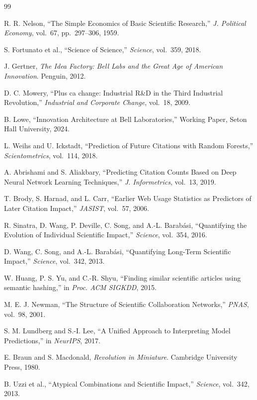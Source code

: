 \documentclass[journal]{IEEEtran}
\begin{document}
\begin{thebibliography}{99}

R. R. Nelson, ``The Simple Economics of Basic Scientific Research,''
\textit{J. Political Economy}, vol.~67, pp.~297--306, 1959.

S. Fortunato et al., ``Science of Science,'' \textit{Science}, vol.~359, 2018.

J. Gertner, \textit{The Idea Factory: Bell Labs and the Great Age of American Innovation}. Penguin, 2012.

D. C. Mowery, ``Plus ca change: Industrial R\&D in the Third Industrial Revolution,'' \textit{Industrial and Corporate Change}, vol.~18, 2009.

B. Lowe, ``Innovation Architecture at Bell Laboratories,'' Working Paper, Seton Hall University, 2024.

L. Weihs and U. Ickstadt, ``Prediction of Future Citations with Random Forests,'' \textit{Scientometrics}, vol.~114, 2018.

A. Abrishami and S. Aliakbary, ``Predicting Citation Counts Based on Deep Neural Network Learning Techniques,'' \textit{J. Informetrics}, vol.~13, 2019.

T. Brody, S. Harnad, and L. Carr, ``Earlier Web Usage Statistics as Predictors of Later Citation Impact,'' \textit{JASIST}, vol.~57, 2006.

R. Sinatra, D. Wang, P. Deville, C. Song, and A.-L. Barab\'asi, ``Quantifying the Evolution of Individual Scientific Impact,'' \textit{Science}, vol.~354, 2016.

D. Wang, C. Song, and A.-L. Barab\'asi, ``Quantifying Long-Term Scientific Impact,'' \textit{Science}, vol.~342, 2013.

W. Huang, P. S. Yu, and C.-R. Shyu, ``Finding similar scientific articles using semantic hashing,'' in \textit{Proc. ACM SIGKDD}, 2015.

M. E. J. Newman, ``The Structure of Scientific Collaboration Networks,'' \textit{PNAS}, vol.~98, 2001.

S. M. Lundberg and S.-I. Lee, ``A Unified Approach to Interpreting Model Predictions,'' in \textit{NeurIPS}, 2017.

E. Braun and S. Macdonald, \textit{Revolution in Miniature}. Cambridge University Press, 1980.

B. Uzzi et al., ``Atypical Combinations and Scientific Impact,'' \textit{Science}, vol.~342, 2013.

\end{thebibliography}
\end{document}

